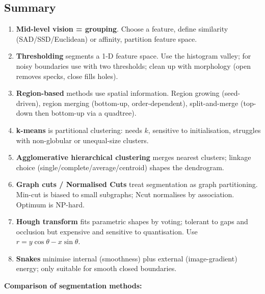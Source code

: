 \bigseparator

\subsection{Summary}

\begin{keybox}
\begin{enumerate}
  \item \textbf{Mid-level vision = grouping}. Choose a feature, define similarity (SAD/SSD/Euclidean) or affinity, partition feature space.
  \item \textbf{Thresholding} segments a 1-D feature space. Use the histogram valley; for noisy boundaries use  with two thresholds; clean up with morphology (open removes specks, close fills holes).
  \item \textbf{Region-based} methods use spatial information. Region growing (seed-driven), region merging (bottom-up, order-dependent), split-and-merge (top-down then bottom-up via a quadtree).
  \item \textbf{k-means} is partitional clustering: needs $k$, sensitive to initialisation, struggles with non-globular or unequal-size clusters.
  \item \textbf{Agglomerative hierarchical clustering} merges nearest clusters; linkage choice (single/complete/average/centroid) shapes the dendrogram.
  \item \textbf{Graph cuts / Normalised Cuts} treat segmentation as graph partitioning. Min-cut is biased to small subgraphs; Ncut normalises by association. Optimum is NP-hard.
  \item \textbf{Hough transform} fits parametric shapes by voting; tolerant to gaps and occlusion but expensive and sensitive to quantisation. Use $r = y\cos\theta - x\sin\theta$.
  \item \textbf{Snakes} minimise internal (smoothness) plus external (image-gradient) energy; only suitable for smooth closed boundaries.
\end{enumerate}
\end{keybox}

\textbf{Comparison of segmentation methods:}

